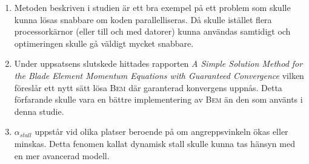 \begin{enumerate}
    
    \item Metoden beskriven i studien är ett bra exempel på ett problem som skulle kunna lösas snabbare om koden parallelliseras. Då skulle istället flera processorkärnor (eller till och med datorer) kunna användas samtidigt och optimeringen skulle gå väldigt mycket snabbare. 
    
    \item Under uppsatsens slutskede hittades rapporten \emph{A Simple Solution Method for the Blade Element Momentum Equations with Guaranteed Convergence} \citep{Andrew} vilken föreslår ett nytt sätt lösa \textsc{Bem} där garanterad konvergens uppnås. Detta förfarande skulle vara en bättre implementering av \textsc{Bem} än den som använts i denna studie.

    \item $\alpha_{stall}$ uppstår vid olika platser beroende på om angreppsvinkeln ökas eller minskas. Detta fenomen kallat dynamisk stall skulle kunna tas hänsyn med en mer avancerad modell.

\end{enumerate}







